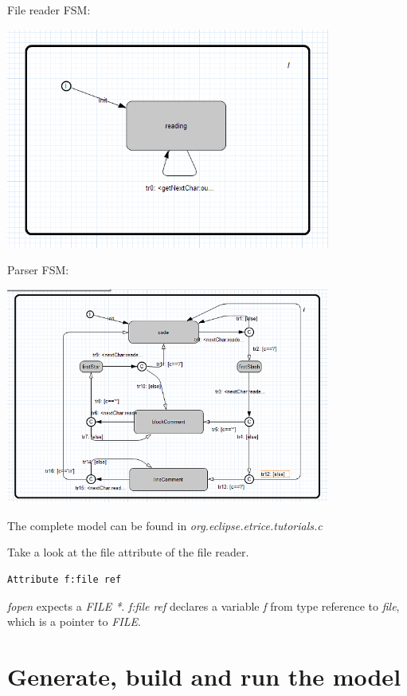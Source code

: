 File reader FSM:

\includegraphics[width=0.8\textwidth]{images/036-RemoveCommentC05.png}

Parser FSM:

\includegraphics[width=0.8\textwidth]{images/036-RemoveCommentC06.png}

The complete model can be found in \textit{org.eclipse.etrice.tutorials.c}

Take a look at the file attribute of the file reader. 

\begin{verbatim}
Attribute f:file ref
\end{verbatim}

\textit{fopen} expects a \textit{FILE *}. \textit{f:file ref} declares a variable \textit{f} from type reference to \textit{file}, which is a pointer to \textit{FILE}.


\section{Generate, build and run the model}

